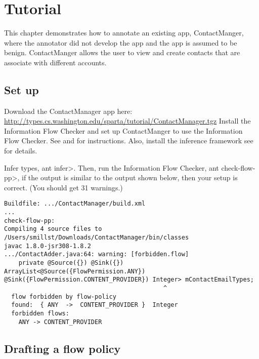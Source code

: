 \htmlhr


\newcommand{\method}[1]{\paragraph{#1}}
\newcommand{\annomethod}[1]{\small{\texttt{#1}}\newline}
\chapter{Tutorial\label{tutorial}}

This chapter demonstrates how to annotate an existing app, ContactManger,
 where the annotator did not develop the app and the app is assumed to be benign.
   ContactManger allows the user to view and create contacts that are associate 
   with different accounts.  


\section{Set up}
Download the ContactManager app here: \url{http://types.cs.washington.edu/sparta/tutorial/ContactManager.tgz}
Install the Information Flow Checker and set up ContactManger to use the Information Flow Checker. 
See   and  for instructions. Also, install the inference framework
see \secref{} for details.

Infer types, \<ant infer>.
Then, run the Information Flow Checker, \<ant check-flow-pp>, if the output is similar to 
the output shown below, then your setup is correct.  (You should get 31 warnings.)

\begin{Verbatim}
Buildfile: .../ContactManager/build.xml
...
check-flow-pp:
Compiling 4 source files to /Users/smillst/Downloads/ContactManager/bin/classes
javac 1.8.0-jsr308-1.8.2
.../ContactAdder.java:64: warning: [forbidden.flow]
    private @Source({}) @Sink({}) ArrayList<@Source({FlowPermission.ANY}) @Sink({FlowPermission.CONTENT_PROVIDER}) Integer> mContactEmailTypes;
                                            ^
  flow forbidden by flow-policy
  found:  { ANY  ->  CONTENT_PROVIDER }  Integer
  forbidden flows:
    ANY -> CONTENT_PROVIDER
\end{Verbatim} 

\section{Drafting a flow policy}

